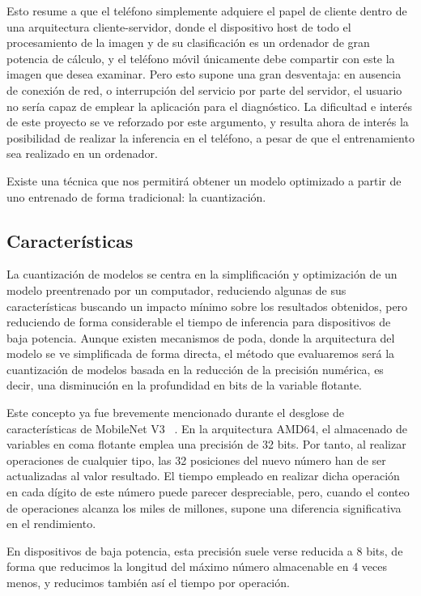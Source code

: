 Esto resume a que el teléfono simplemente adquiere el papel de cliente dentro de una arquitectura cliente-servidor, donde el dispositivo host de todo el procesamiento de la imagen y de su clasificación es un ordenador de gran potencia de cálculo, y el teléfono móvil únicamente debe compartir con este la imagen que desea examinar. Pero esto supone una gran desventaja: en ausencia de conexión de red, o interrupción del servicio por parte del servidor, el usuario no sería capaz de emplear la aplicación para el diagnóstico. La dificultad e interés de este proyecto se ve reforzado por este argumento, y resulta ahora de interés la posibilidad de realizar la inferencia en el teléfono, a pesar de que el entrenamiento sea realizado en un ordenador.

Existe una técnica que nos permitirá obtener un modelo optimizado a partir de uno entrenado de forma tradicional: la cuantización.

\subsection{Características}

La cuantización de modelos se centra en la simplificación y optimización de un modelo preentrenado por un computador, reduciendo algunas de sus características buscando un impacto mínimo sobre los resultados obtenidos, pero reduciendo de forma considerable el tiempo de inferencia para dispositivos de baja potencia. Aunque existen mecanismos de poda, donde la arquitectura del modelo se ve simplificada de forma directa, el método que evaluaremos será la cuantización de modelos basada en la reducción de la precisión numérica, es decir, una disminución en la profundidad en bits de la variable flotante.

Este concepto ya fue brevemente mencionado durante el desglose de características de MobileNet V3 ~\cite{howard2019searching}. En la arquitectura AMD64, el almacenado de variables en coma flotante emplea una precisión de 32 bits. Por tanto, al realizar operaciones de cualquier tipo, las 32 posiciones del nuevo número han de ser actualizadas al valor resultado. El tiempo empleado en realizar dicha operación en cada dígito de este número puede parecer despreciable, pero, cuando el conteo de operaciones alcanza los miles de millones, supone una diferencia significativa en el rendimiento. 

En dispositivos de baja potencia, esta precisión suele verse reducida a 8 bits, de forma que reducimos la longitud del máximo número almacenable en 4 veces menos, y reducimos también así el tiempo por operación.

